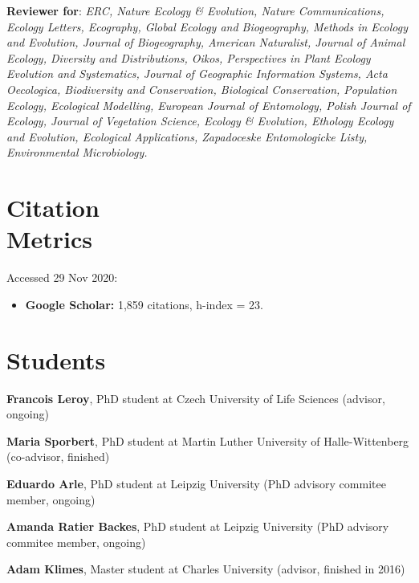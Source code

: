 {\bf Reviewer for}: \textit{ERC, Nature Ecology \& Evolution, Nature Communications, Ecology Letters, Ecography, Global Ecology and Biogeography, Methods in Ecology and Evolution, Journal of Biogeography, American Naturalist, Journal of Animal Ecology, Diversity and Distributions, Oikos, Perspectives in Plant Ecology Evolution and Systematics, Journal of Geographic Information Systems, Acta Oecologica, Biodiversity and Conservation, Biological Conservation, Population Ecology, Ecological Modelling, European Journal of Entomology, Polish Journal of Ecology, Journal of Vegetation Science, Ecology \& Evolution, Ethology Ecology and Evolution, Ecological Applications, Zapadoceske Entomologicke Listy, Environmental Microbiology.}

\HRule

\section{Citation \\ Metrics}

Accessed 29 Nov 2020:

\begin{itemize}
\item \textbf{Google Scholar:} 1,859 citations, h-index  = 23.

\end{itemize}


\HRule

\section{Students}

\begin{innerlist}

\item[]{\bf Francois Leroy}, PhD student at Czech University of Life Sciences (advisor, ongoing)

\item[]{\bf Maria Sporbert}, PhD student at Martin Luther University of Halle-Wittenberg (co-advisor, finished)

\item[]{\bf Eduardo Arle}, PhD student at Leipzig University (PhD advisory commitee member, ongoing)

\item[]{\bf Amanda Ratier Backes}, PhD student at Leipzig University (PhD advisory commitee member, ongoing)

\medskip

\item[]{\bf Adam Klimes}, Master student at Charles University (advisor, finished in 2016)

\end{innerlist}

